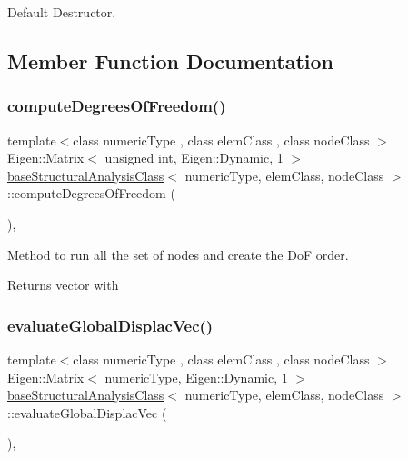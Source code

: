 Default Destructor. 

\subsection{Member Function Documentation}
\mbox{\label{classbase_structural_analysis_class_aca53b1f1642a1dae799df8f906479f93}} 
\subsubsection{\texorpdfstring{compute\+Degrees\+Of\+Freedom()}{computeDegreesOfFreedom()}}
{\footnotesize\ttfamily template$<$class numeric\+Type , class elem\+Class , class node\+Class $>$ \\
Eigen\+::\+Matrix$<$ unsigned int, Eigen\+::\+Dynamic, 1 $>$ \mbox{\hyperlink{classbase_structural_analysis_class}{base\+Structural\+Analysis\+Class}}$<$ numeric\+Type, elem\+Class, node\+Class $>$\+::compute\+Degrees\+Of\+Freedom (\begin{DoxyParamCaption}{ }\end{DoxyParamCaption})\hspace{0.3cm}{\ttfamily [protected]}, {\ttfamily [virtual]}}

Method to run all the set of nodes and create the DoF order. \begin{DoxyReturn}{Returns}
vector with 
\end{DoxyReturn}
\mbox{\label{classbase_structural_analysis_class_a8ae8b924f3c1c20f131db1570544cb90}} 
\subsubsection{\texorpdfstring{evaluate\+Global\+Displac\+Vec()}{evaluateGlobalDisplacVec()}}
{\footnotesize\ttfamily template$<$class numeric\+Type , class elem\+Class , class node\+Class $>$ \\
Eigen\+::\+Matrix$<$ numeric\+Type, Eigen\+::\+Dynamic, 1 $>$ \mbox{\hyperlink{classbase_structural_analysis_class}{base\+Structural\+Analysis\+Class}}$<$ numeric\+Type, elem\+Class, node\+Class $>$\+::evaluate\+Global\+Displac\+Vec (\begin{DoxyParamCaption}{ }\end{DoxyParamCaption})\hspace{0.3cm}{\ttfamily [protected]}, {\ttfamily [virtual]}}

